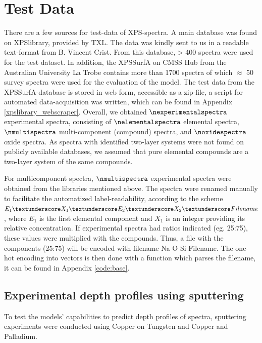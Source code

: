
\section{Test Data}
\label{test_data}

There are a few sources for test-data of XPS-spectra. A main database was found on XPSlibrary, provided by TXL. The data was kindly sent to us in a readable text-format from B. Vincent Crist. From this database, > 400 spectra were used for the test dataset. In addition, the XPSSurfA on CMSS Hub from the Australian University La Trobe contains more than 1700 spectra of which $\approx$ 50 survey spectra were used for the evaluation of the model. The test data from the XPSSurfA-database is stored in web form, accessible as a zip-file, a script for automated data-acquisition was written, which can be found in Appendix \ref{xpslibrary_webscraper}.
Overall, we obtained $\nexperimentalspectra$ experimental spectra, consisting of $\nelementalspectra$ elemental spectra, $\nmultispectra$  multi-component (compound) spectra, and $\noxidespectra$ oxide spectra.
As spectra with identified two-layer systems were not found on publicly available databases, we assumed that pure elemental compounds are a two-layer system of the same compounds.

For multicomponent spectra, $\nmultispectra$ experimental spectra were obtained from the libraries mentioned above. The spectra were renamed manually to facilitate the automatized label-readability, according to the scheme ${E_{1}\textunderscore X_{1} 	\textunderscore E_{2} 	\textunderscore X_{2} 	\textunderscore Filename}$, where $E_{1}$ is the first elemental component and $X_{1}$ is an integer providing its relative concentration. If experimental spectra had ratios indicated (eg. 25:75), these values were multiplied with the compounds. Thus, a file with the components  (25:75) will be encoded with filename Na  \textunderscore O  \textunderscore Si  \textunderscore Filename. The one-hot encoding into vectors is then done with a function which parses the filename, it can be found in Appendix \ref{code:base}.

\subsection{Experimental depth profiles using sputtering}
To test the models' capabilities to predict depth profiles of spectra, sputtering experiments were conducted using Copper on Tungsten and Copper and Palladium.


